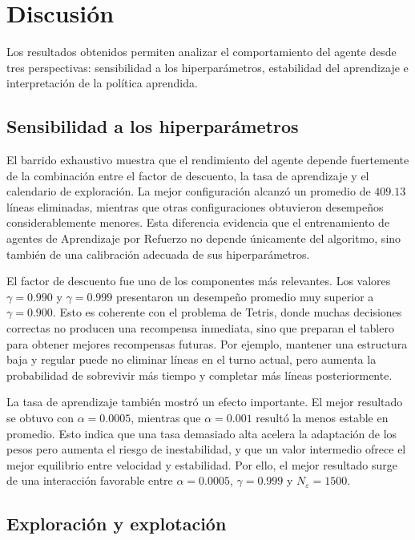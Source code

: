 \section{Discusión}
\label{sec:discusion}

Los resultados obtenidos permiten analizar el comportamiento del agente desde tres perspectivas: sensibilidad a los hiperparámetros, estabilidad del aprendizaje e interpretación de la política aprendida.

\subsection{Sensibilidad a los hiperparámetros}

El barrido exhaustivo muestra que el rendimiento del agente depende fuertemente de la combinación entre el factor de descuento, la tasa de aprendizaje y el calendario de exploración. La mejor configuración alcanzó un promedio de $409.13$ líneas eliminadas, mientras que otras configuraciones obtuvieron desempeños considerablemente menores. Esta diferencia evidencia que el entrenamiento de agentes de Aprendizaje por Refuerzo no depende únicamente del algoritmo, sino también de una calibración adecuada de sus hiperparámetros.

El factor de descuento fue uno de los componentes más relevantes. Los valores $\gamma=0.990$ y $\gamma=0.999$ presentaron un desempeño promedio muy superior a $\gamma=0.900$. Esto es coherente con el problema de Tetris, donde muchas decisiones correctas no producen una recompensa inmediata, sino que preparan el tablero para obtener mejores recompensas futuras. Por ejemplo, mantener una estructura baja y regular puede no eliminar líneas en el turno actual, pero aumenta la probabilidad de sobrevivir más tiempo y completar más líneas posteriormente.

La tasa de aprendizaje también mostró un efecto importante. El mejor resultado se obtuvo con $\alpha=0.0005$, mientras que $\alpha=0.001$ resultó la menos estable en promedio. Esto indica que una tasa demasiado alta acelera la adaptación de los pesos pero aumenta el riesgo de inestabilidad, y que un valor intermedio ofrece el mejor equilibrio entre velocidad y estabilidad. Por ello, el mejor resultado surge de una interacción favorable entre $\alpha=0.0005$, $\gamma=0.999$ y $N_{\varepsilon}=1500$.

\subsection{Exploración y explotación}

